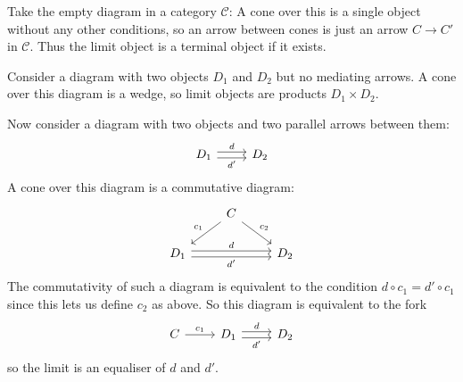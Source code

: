 \documentclass[article, a4paper, 11pt, oneside]{memoir}
\numberwithin{equation}{chapter}
\newcommand{\cat}[1]{\mathcal{#1}}
\newcommand{\catC}{\cat{C}}
\theoremstyle{myexample}
\theoremstyle{myexamplebreak}
\begin{document}
\begin{examplebreak}
    \begin{enumexample}
        \item Take the empty diagram in a category $\catC$: A cone over this is a single object without any other conditions, so an arrow between cones is just an arrow $C \to C'$ in $\catC$. Thus the limit object is a terminal object if it exists.
        
        \item Consider a diagram with two objects $D_1$ and $D_2$ but no mediating arrows. A cone over this diagram is a wedge, so limit objects are products $D_1 \times D_2$.
        
        \item Now consider a diagram with two objects and two parallel arrows between them:
        \begin{equation*}
            \begin{tikzcd}
                D_1
                    \ar[r, "d", shift left]
                    \ar[r, "d'", shift right, swap]
                & D_2
            \end{tikzcd}
        \end{equation*}
        A cone over this diagram is a commutative diagram:
        \begin{equation*}
            \begin{tikzcd}
                & C
                    \ar[dl, "c_1", swap]
                    \ar[dr, "c_2"]
                \\
                D_1
                    \ar[rr, "d", shift left]
                    \ar[rr, "d'", shift right, swap]
                && D_2
            \end{tikzcd}
        \end{equation*}
        The commutativity of such a diagram is equivalent to the condition $d \circ c_1 = d' \circ c_1$ since this lets us define $c_2$ as above. So this diagram is equivalent to the fork
        \begin{equation*}
            \begin{tikzcd}
                C
                    \ar[r, "c_1"]
                & D_1
                    \ar[r, "d", shift left]
                    \ar[r, "d'", shift right, swap]
                & D_2
            \end{tikzcd}
        \end{equation*}
        so the limit is an equaliser of $d$ and $d'$.
    \end{enumexample}
\end{examplebreak}
\end{document}
